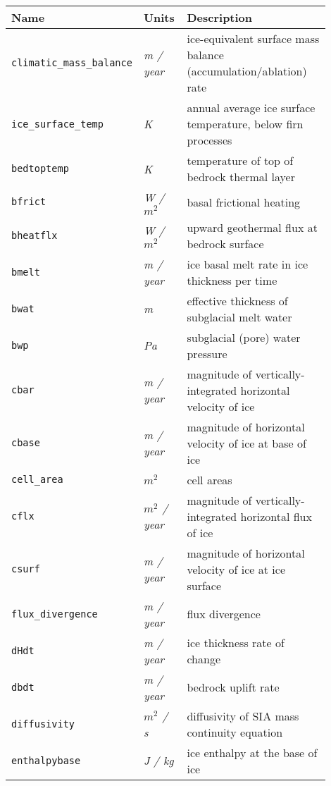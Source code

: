 \begin{table}[ht]
  \centering
  \begin{tabular}{p{0.15\linewidth}p{0.15\linewidth}p{0.6\linewidth}}
    \toprule
    \textbf{Name} & \textbf{Units} & \textbf{Description} \\
    \midrule
    \texttt{climatic_mass_balance} & \textsl{m / year} & ice-equivalent surface mass balance (accumulation/ablation) rate \\
    \texttt{ice_surface_temp} & \textsl{K} & annual average ice surface temperature, below firn processes \\
    \texttt{bedtoptemp} & \textsl{K} & temperature of top of bedrock thermal layer \\
    \texttt{bfrict} & \textsl{W  / $m^2$} &  basal frictional heating \\
    \texttt{bheatflx} & \textsl{W  / $m^2$} & upward geothermal flux at bedrock surface \\
    \texttt{bmelt} & \textsl{m / year} & ice basal melt rate in ice thickness per time \\
    \texttt{bwat} & \textsl{m} & effective thickness of subglacial melt water \\
    \texttt{bwp} & \textsl{Pa} & subglacial (pore) water pressure \\
    \texttt{cbar} & \textsl{m / year} &  magnitude of vertically-integrated horizontal velocity of ice \\
    \texttt{cbase} & \textsl{m / year} &  magnitude of horizontal velocity of ice at base of ice \\
    \texttt{cell_area} & \textsl{$m^{2}$} & cell areas \\
    \texttt{cflx} & \textsl{$m^{2}$ / year} &  magnitude of vertically-integrated horizontal flux of ice \\
    \texttt{csurf} & \textsl{m / year} &  magnitude of horizontal velocity of ice at ice surface \\
    \texttt{flux_divergence} & \textsl{m / year} &  flux divergence \\
    \texttt{dHdt} & \textsl{m / year} &  ice thickness rate of change \\
    \texttt{dbdt} & \textsl{m / year} & bedrock uplift rate \\
    \texttt{diffusivity} & \textsl{$m^{2}$  / s} &  diffusivity of SIA mass continuity equation \\
    \texttt{enthalpybase} & \textsl{J  / kg} &  ice enthalpy at the base of ice \\

\end{tabular}
\end{table}
